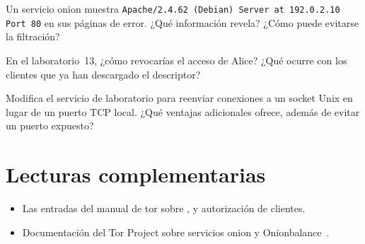 \begin{esercizio}[2]\label{es:21-fuga}
Un servicio onion muestra \texttt{Apache/2.4.62 (Debian) Server at 192.0.2.10 Port 80} en sus páginas de error. ¿Qué información revela? ¿Cómo puede evitarse la filtración?
\end{esercizio}

\begin{esercizio}[2]\label{es:21-revoca}
En el laboratorio~13, ¿cómo revocarías el acceso de Alice? ¿Qué ocurre con los clientes que ya han descargado el descriptor?
\end{esercizio}

\begin{esercizio}[3]\label{es:21-socket}
Modifica el servicio de laboratorio para reenviar conexiones a un socket Unix en lugar de un puerto TCP local. ¿Qué ventajas adicionales ofrece, además de evitar un puerto expuesto?
\end{esercizio}

\section*{Lecturas complementarias}
\begin{itemize}
  \item Las entradas del manual de tor sobre ,  y autorización de clientes.
  \item Documentación del Tor Project sobre servicios onion y Onionbalance~\cite{onionbalance}.
\end{itemize}
